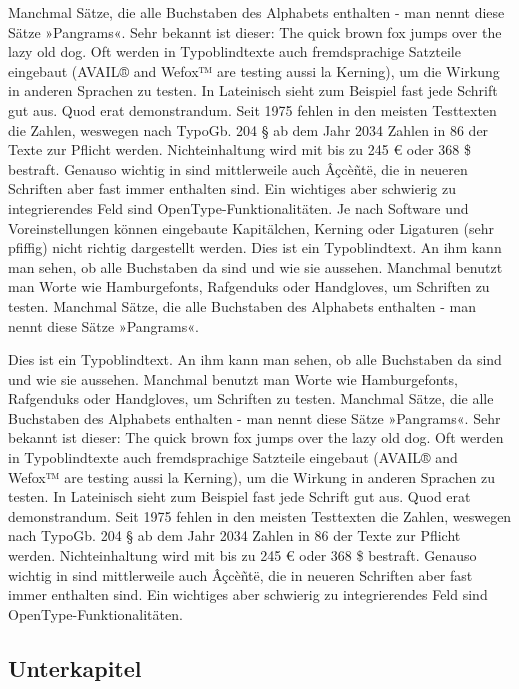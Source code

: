 Manchmal Sätze, die alle Buchstaben des Alphabets enthalten - man nennt diese Sätze »Pangrams«. Sehr bekannt ist dieser: The quick brown fox jumps over the lazy old dog. Oft werden in Typoblindtexte auch fremdsprachige Satzteile eingebaut (AVAIL® and Wefox™ are testing aussi la Kerning), um die Wirkung in anderen Sprachen zu testen. In Lateinisch sieht zum Beispiel fast jede Schrift gut aus. Quod erat demonstrandum. Seit 1975 fehlen in den meisten Testtexten die Zahlen, weswegen nach TypoGb. 204 § ab dem Jahr 2034 Zahlen in 86 der Texte zur Pflicht werden. Nichteinhaltung wird mit bis zu 245 € oder 368 \$ bestraft. Genauso wichtig in sind mittlerweile auch Âçcèñtë, die in neueren Schriften aber fast immer enthalten sind. Ein wichtiges aber schwierig zu integrierendes Feld sind OpenType-Funktionalitäten. Je nach Software und Voreinstellungen können eingebaute Kapitälchen, Kerning oder Ligaturen (sehr pfiffig) nicht richtig dargestellt werden. Dies ist ein Typoblindtext. An ihm kann man sehen, ob alle Buchstaben da sind und wie sie aussehen. Manchmal benutzt man Worte wie Hamburgefonts, Rafgenduks oder Handgloves, um Schriften zu testen. Manchmal Sätze, die alle Buchstaben des Alphabets enthalten - man nennt diese Sätze »Pangrams«.


Dies ist ein Typoblindtext. An ihm kann man sehen, ob alle Buchstaben da sind und wie sie aussehen. Manchmal benutzt man Worte wie Hamburgefonts, Rafgenduks oder Handgloves, um Schriften zu testen. Manchmal Sätze, die alle Buchstaben des Alphabets enthalten - man nennt diese Sätze »Pangrams«. Sehr bekannt ist dieser: The quick brown fox jumps over the lazy old dog. Oft werden in Typoblindtexte auch fremdsprachige Satzteile eingebaut (AVAIL® and Wefox™ are testing aussi la Kerning), um die Wirkung in anderen Sprachen zu testen. In Lateinisch sieht zum Beispiel fast jede Schrift gut aus. Quod erat demonstrandum. Seit 1975 fehlen in den meisten Testtexten die Zahlen, weswegen nach TypoGb. 204 § ab dem Jahr 2034 Zahlen in 86 der Texte zur Pflicht werden. Nichteinhaltung wird mit bis zu 245 € oder 368 \$ bestraft. Genauso wichtig in sind mittlerweile auch Âçcèñtë, die in neueren Schriften aber fast immer enthalten sind. Ein wichtiges aber schwierig zu integrierendes Feld sind OpenType-Funktionalitäten.

\subsection{Unterkapitel}

